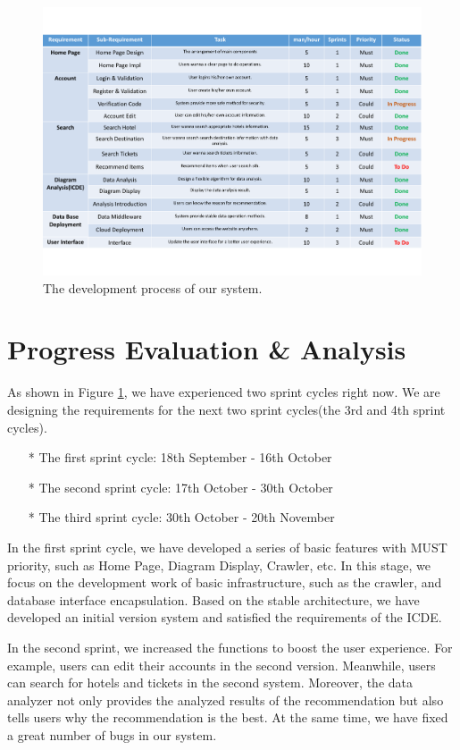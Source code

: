 \documentclass[conference]{IEEEtran}
\begin{document}
\begin{figure}[htbp]
\centerline{\includegraphics[width=1.0\textwidth]{dev_process.pdf}}
\caption{The development process of our system.}
\label{dev_task_diagram}
\end{figure}


\section{\textbf{Progress Evaluation \& Analysis }}

As shown in Figure \ref{dev_task_diagram}, we have experienced two sprint cycles right now. We are designing the requirements for the next two sprint cycles(the 3rd and 4th sprint cycles).

\begin{itemize}
\item[*] The first sprint cycle: 18th September - 16th October
\item[*] The second sprint cycle: 17th October - 30th October
\item[*] The third sprint cycle: 30th October - 20th November
\end{itemize}

In the first sprint cycle, we have developed a series of basic features with MUST priority, such as Home Page, Diagram Display, Crawler, etc. In this stage, we focus on the development work of basic infrastructure, such as the crawler, and database interface encapsulation. Based on the stable architecture, we have developed an initial version system and satisfied the requirements of the ICDE.

In the second sprint, we increased the functions to boost the user experience. For example, users can edit their accounts in the second version. Meanwhile, users can search for hotels and tickets in the second system. Moreover, the data analyzer not only provides the analyzed results of the recommendation but also tells users why the recommendation is the best. At the same time, we have fixed a great number of bugs in our system.
\end{document}
